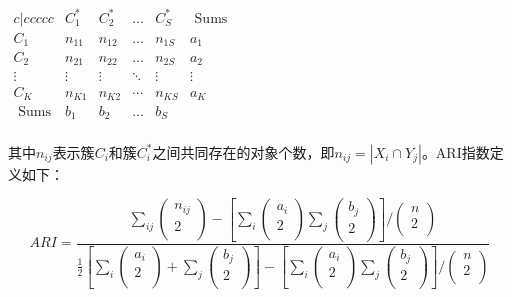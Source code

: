 $\begin{matrix}{c|ccccc}
	&		C_{1}^{*}&		C_{2}^{*}&		\dots&		C_{S}^{*}&		\,\,\text{Sums}\\
	\hline
	C_1&		n_{11}&		n_{12}&		\dots&		n_{1S}&		a_1\\
	C_2&		n_{21}&		n_{22}&		\dots&		n_{2S}&		a_2\\
	\vdots&		\vdots&		\vdots&		\ddots&		\vdots&		\vdots\\
	C_K&		n_{K1}&		n_{K2}&		\cdots&		n_{KS}&		a_K\\
	\,\,\text{Sums}&		b_1&		b_2&		\dots&		b_S&		\\
\end{matrix}$

其中$n_{ij}$表示簇$C_{i}$和簇$C_{i}^{*}$之间共同存在的对象个数，即$n_{i j}=\left|X_{i} \cap Y_{j}\right|$。ARI指数定义如下：

\begin{equation}
\label{ARI}
ARI=\frac{\sum_{ij}{\left( \begin{array}{c}
	n_{ij}\\
	2\\
\end{array} \right)}-\left[ \sum_i{\left( \begin{array}{c}
	a_i\\
	2\\
\end{array} \right)}\sum_j{\left( \begin{array}{c}
	b_j\\
	2\\
\end{array} \right)} \right] /\left( \begin{array}{c}
	n\\
	2\\
\end{array} \right)}{\frac{1}{2}\left[ \sum_i{\left( \begin{array}{c}
	a_i\\
	2\\
\end{array} \right)}+\sum_j{\left( \begin{array}{c}
	b_j\\
	2\\
\end{array} \right)} \right] -\left[ \sum_i{\left( \begin{array}{c}
	a_i\\
	2\\
\end{array} \right)}\sum_j{\left( \begin{array}{c}
	b_j\\
	2\\
\end{array} \right)} \right] /\left( \begin{array}{c}
	n\\
	2\\
\end{array} \right)}
\end{equation}



